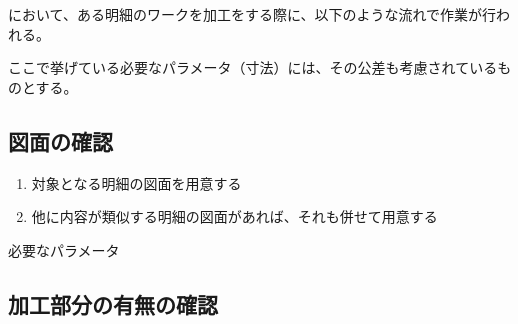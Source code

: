 \clearpage
\MMC において、ある明細のワークを加工をする際に、以下のような流れで作業が行われる。
\begin{marker}
ここで挙げている必要なパラメータ（寸法）には、その公差も考慮されているものとする。
\end{marker}


\subsection{図面の確認}
\begin{enumerate}[label=\sarrow]
\item 対象となる明細の図面を用意する
\item 他に内容が類似する明細の図面があれば、それも併せて用意する
\end{enumerate}
\begin{Parameter}{必要なパラメータ}
\PMDrawingExists%
\PMDrawingNumber%
\end{Parameter}


\subsection{加工部分の有無の確認}

